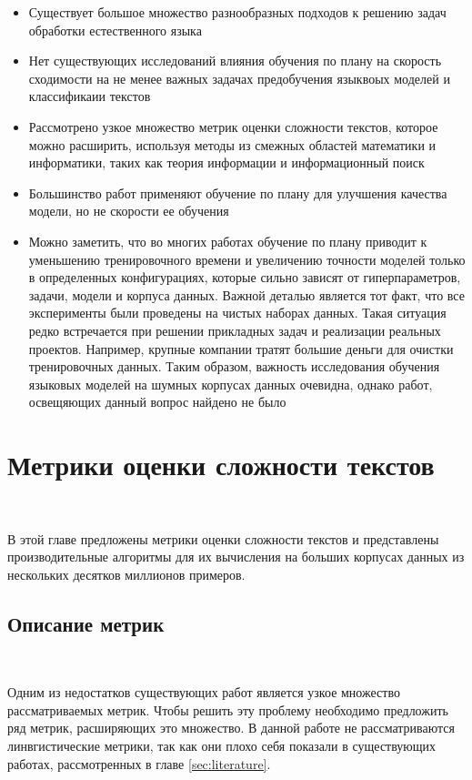\documentclass{spbau-diploma}
\begin{document}
\begin{itemize}
	\item Существует большое множество разнообразных подходов к решению задач обработки естественного языка
	\item Нет существующих исследований влияния обучения по плану на скорость сходимости на не менее важных задачах предобучения языквоых моделей и классификаии текстов
	\item Рассмотрено узкое множество метрик оценки сложности текстов, которое можно расширить, используя методы из смежных областей математики и информатики, таких как теория информации и информационный поиск
	\item Большинство работ применяют обучение по плану для улучшения качества модели, но не скорости ее обучения
	\item Можно заметить, что во многих работах обучение по плану приводит к уменьшению тренировочного времени и увеличению точности моделей только в определенных конфигурациях, которые сильно зависят от гиперпараметров, задачи, модели и корпуса данных. Важной деталью является тот факт, что все эксперименты были проведены на чистых наборах данных. Такая ситуация редко встречается при решении прикладных задач и реализации реальных проектов. Например, крупные компании тратят большие деньги для очистки тренировочных данных. Таким образом, важность исследования обучения языковых моделей на шумных корпусах данных очевидна, однако работ, освещяющих данный вопрос найдено не было
\end{itemize}

\section{Метрики оценки сложности текстов} \label{sec:metrics}
\ 

В этой главе предложены метрики оценки сложности текстов и представлены производительные алгоритмы для их вычисления на больших корпусах данных из нескольких десятков миллионов примеров.

\subsection{Описание метрик}
\ 

Одним из недостатков существующих работ является узкое множество рассматриваемых метрик. Чтобы решить эту проблему необходимо предложить ряд метрик, расширяющих это множество. В данной работе не рассматриваются линвгистические метрики, так как они плохо себя показали в существующих работах, рассмотренных в главе \ref{sec:literature}.
\end{document}
